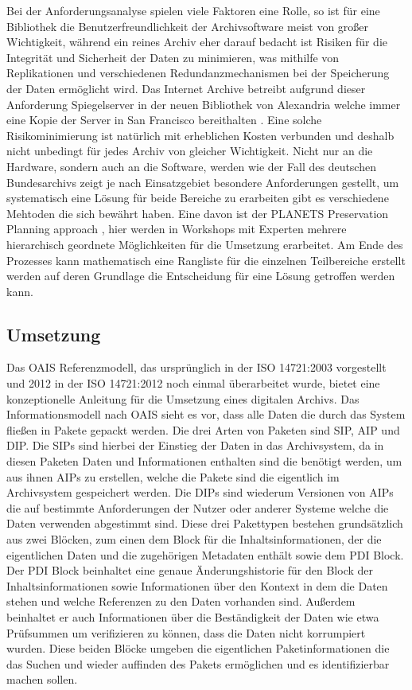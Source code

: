 \documentclass[conference,compsoc,final,a4paper]{IEEEtran}
\begin{document}
Bei der Anforderungsanalyse spielen viele Faktoren eine Rolle, so ist für eine Bibliothek die Benutzerfreundlichkeit der Archivsoftware meist von großer Wichtigkeit, während ein reines Archiv eher darauf bedacht ist Risiken für die Integrität und Sicherheit der Daten zu minimieren, was mithilfe von Replikationen und verschiedenen Redundanzmechanismen bei der Speicherung der Daten ermöglicht wird. Das Internet Archive betreibt aufgrund dieser Anforderung Spiegelserver in der neuen Bibliothek von Alexandria welche immer eine Kopie der Server in San Francisco bereithalten \autocite{BibAlexIAMirror}. Eine solche Risikominimierung ist natürlich mit erheblichen Kosten verbunden und deshalb nicht unbedingt für jedes Archiv von gleicher Wichtigkeit. Nicht nur an die Hardware, sondern auch an die Software, werden wie der Fall des deutschen Bundesarchivs zeigt je nach Einsatzgebiet besondere Anforderungen gestellt, um systematisch eine Lösung für beide Bereiche zu erarbeiten gibt es verschiedene Mehtoden die sich bewährt haben. Eine davon ist der PLANETS Preservation Planning approach \autocite{Strodl2007}, hier werden in Workshops mit Experten mehrere hierarchisch geordnete Möglichkeiten für die Umsetzung erarbeitet. Am Ende des Prozesses kann mathematisch eine Rangliste für die einzelnen Teilbereiche erstellt werden auf deren Grundlage die Entscheidung für eine Lösung getroffen werden kann.

\subsection{Umsetzung}
Das \ac{OAIS} Referenzmodell, das ursprünglich in der ISO 14721:2003 vorgestellt und 2012 in der ISO 14721:2012 noch einmal überarbeitet wurde, bietet eine konzeptionelle Anleitung für die Umsetzung eines digitalen Archivs. Das Informationsmodell nach \ac{OAIS} sieht es vor, dass alle Daten die durch das System fließen in Pakete gepackt werden. Die drei Arten von Paketen sind \ac{SIP}, \ac{AIP} und \ac{DIP}. Die \ac{SIP}s sind hierbei der Einstieg der Daten in das Archivsystem, da in diesen Paketen Daten und Informationen enthalten sind die benötigt werden, um aus ihnen \ac{AIP}s zu erstellen, welche die Pakete sind die eigentlich im Archivsystem gespeichert werden. Die \ac{DIP}s sind wiederum Versionen von \ac{AIP}s die auf bestimmte Anforderungen der Nutzer oder anderer Systeme welche die Daten verwenden abgestimmt sind. Diese drei Pakettypen bestehen grundsätzlich aus zwei Blöcken, zum einen dem Block für die Inhaltsinformationen, der die eigentlichen Daten und die zugehörigen Metadaten enthält sowie dem \ac{PDI} Block. Der \ac{PDI} Block beinhaltet eine genaue Änderungshistorie für den Block der Inhaltsinformationen sowie Informationen über den Kontext in dem die Daten stehen und welche Referenzen zu den Daten vorhanden sind. Außerdem beinhaltet er auch Informationen über die Beständigkeit der Daten wie etwa Prüfsummen um verifizieren zu können, dass die Daten nicht korrumpiert wurden. Diese beiden Blöcke umgeben die eigentlichen Paketinformationen die das Suchen und wieder auffinden des Pakets ermöglichen und es identifizierbar machen sollen.
\end{document}
